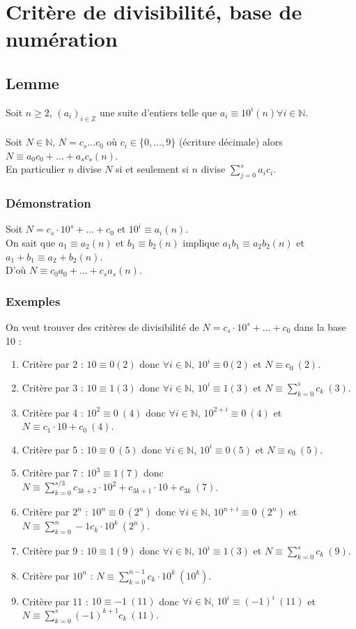 \documentclass[a4paper,10pt]{book} %
\newcommand{\N}{\mathbb{N}}
\newcommand{\Z}{\mathbb{Z}}
\begin{document}
\section{Critère de divisibilité, base de numération}
\subsection{Lemme}
Soit $n\geq 2$, $(a_i)_{i\in\Z}$ une suite d'entiers telle que $a_i\equiv 10^i(n) \forall i\in \N$.\\\\
Soit $N\in \N$, $N=c_s...c_0$ où $c_i\in\{0,...,9\}$ (écriture décimale) alors $N\equiv a_0c_0+...+a_sc_s(n)$.\\
En particulier $n$ divise $N$ si et seulement si $n$ divise $\displaystyle \sum\limits_{j=0}^sa_ic_i$.

\subsubsection{Démonstration}
Soit $N=c_s\cdot 10^s+...+c_0$ et $10^i\equiv a_i(n)$.\\

On sait que $a_1\equiv a_2(n)$ et $b_1\equiv b_2(n)$ implique $a_1b_1\equiv a_2b_2(n)$ et $a_1+b_1\equiv a_2+b_2(n)$.\\

D'où $N\equiv c_0a_0+...+c_sa_s(n)$.

\subsubsection{Exemples}
On veut trouver des critères de divisibilité de $N=c_s\cdot 10^s+...+c_0$ dans la base 10 :

\begin{enumerate}[label=$\bullet$]
\item Critère par $2$ : $10\equiv 0(2)$ donc $\forall i\in \N$, $10^i\equiv 0(2)$ et $N\equiv c_0~(2)$.
\item Critère par 3 : $10\equiv 1(3)$ donc $\forall i\in \N$, $10^i\equiv 1(3)$ et $N\equiv \sum_{k=0}^sc_k~(3)$.
\item Critère par 4 : $10^2\equiv 0~(4)$ donc $\forall i\in\N$, $10^{2+i}\equiv 0~(4)$ et $N\equiv c_1\cdot 10+c_0~(4)$.
\item Critère par 5 : $10\equiv 0~(5)$ donc $\forall i\in \N$, $10^i\equiv 0(5)$ et $N\equiv c_0~(5)$.
\item Critère par 7 : $10^3\equiv 1(7)$ donc $N\equiv \sum_{k=0}^{s/3}c_{3k+2}\cdot 10^{2}+c_{3k+1}\cdot 10+c_{3k}~(7)$.
\item Critère par $2^n$ : $10^n\equiv 0~(2^n)$ donc $\forall i\in\N$, $10^{n+i}\equiv 0~(2^n)$ et $N\equiv \sum_{k=0}^n-1c_k\cdot 10^k~(2^n)$.
\item Critère par 9 : $10\equiv 1(9)$ donc $\forall i\in \N$, $10^i\equiv 1(3)$ et $N\equiv\sum_{k=0}^sc_k~(9)$.
\item Critère par $10^n$ : $N\equiv \sum_{k=0}^{n-1}c_k\cdot 10^k~(10^k)$.
\item Critère par 11 : $10\equiv -1~(11)$ donc $\forall i\in \N$, $10^i\equiv (-1)^i~(11)$ et $N\equiv \sum_{k=0}^s(-1)^{k+1}c_k~(11)$.
\end{enumerate}
\end{document}
